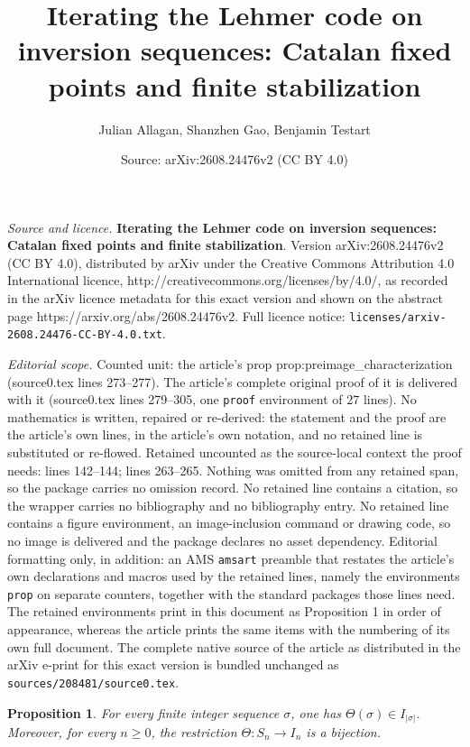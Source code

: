 \documentclass[10pt,a4paper]{amsart}
\title{\textbf{Iterating the Lehmer code on inversion sequences: Catalan fixed points and finite stabilization}}
\author{Julian Allagan, Shanzhen Gao, Benjamin Testart}
\date{Source: arXiv:2608.24476v2 (CC BY 4.0)}
\newtheorem{prop}{Proposition}
\begin{document}
\maketitle

\noindent\emph{Source and licence.} \textbf{Iterating the Lehmer code on inversion sequences: Catalan fixed points and finite stabilization}. Version arXiv:2608.24476v2 (CC BY 4.0), distributed by arXiv under the Creative Commons Attribution 4.0 International licence, http://creativecommons.org/licenses/by/4.0/, as recorded in the arXiv licence metadata for this exact version and shown on the abstract page https://arxiv.org/abs/2608.24476v2. Full licence notice: \texttt{licenses/arxiv-2608.24476-CC-BY-4.0.txt}.\par\smallskip

\noindent\textit{Editorial scope.} Counted unit: the article's prop prop:preimage\_characterization (source0.tex lines 273--277). The article's complete original proof of it is delivered with it (source0.tex lines 279--305, one \texttt{proof} environment of 27 lines). No mathematics is written, repaired or re-derived: the statement and the proof are the article's own lines, in the article's own notation, and no retained line is substituted or re-flowed.  Retained uncounted as the source-local context the proof needs: lines 142--144; lines 263--265.  Nothing was omitted from any retained span, so the package carries no omission record.  No retained line contains a citation, so the wrapper carries no bibliography and no bibliography entry.  No retained line contains a figure environment, an image-inclusion command or drawing code, so no image is delivered and the package declares no asset dependency.  Editorial formatting only, in addition: an AMS \texttt{amsart} preamble that restates the article's own declarations and macros used by the retained lines, namely the environments \texttt{prop} on separate counters, together with the standard packages those lines need.  The retained environments print in this document as Proposition 1 in order of appearance, whereas the article prints the same items with the numbering of its own full document.  The complete native source of the article as distributed in the arXiv e-print for this exact version is bundled unchanged as \texttt{sources/208481/source0.tex}.
\begin{prop}\label{prop:theta_basic}
For every finite integer sequence $\sigma$, one has $\Theta(\sigma)\in I_{|\sigma|}$. Moreover, for every $n\geq0$, the restriction $\Theta:S_n\to I_n$ is a bijection.
\end{prop}
\end{document}
